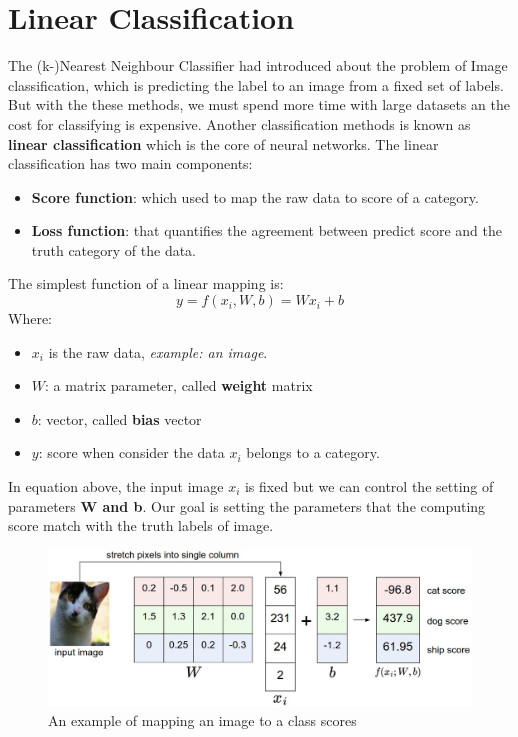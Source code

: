 \section{Linear Classification}
The (k-)Nearest Neighbour Classifier had introduced about the problem of Image classification, which is predicting the label to an image from a fixed set of labels. But with the these methods, we must spend more time with large datasets an the cost for classifying is expensive. Another classification methods is known as \textbf{linear classification} which is the core of neural networks.
The linear classification has two main components: 
\begin{itemize}
	\item \textbf{Score function}:  which used to map the raw data to score of a category.
	\item \textbf{Loss function}: that quantifies the agreement between predict score and the truth category of the data.
\end{itemize}
The simplest function of a linear mapping is:
\begin{equation}
	y = f(x_i,W,b) = Wx_i + b
\end{equation}
Where:
\begin{itemize}
	\item $x_i$ is the raw data, \textit{example: an image}.
	\item $W$: a matrix parameter, called \textbf{weight} matrix
	\item $b$: vector, called \textbf{bias} vector
	\item $y$: score when consider the data $x_i$ belongs to a category.
\end{itemize}
In equation above, the input image \textbf{$x_i$} is fixed but we can control the setting of parameters \textbf{W and b}. Our goal is setting the parameters that the computing score match with the truth labels of image.
\begin{figure}[h]
	\centering
	\includegraphics[scale=0.3]{images/lncex}
	\caption{An example of mapping an image to a class scores}
	\label{figlncex}
\end{figure}~\\
